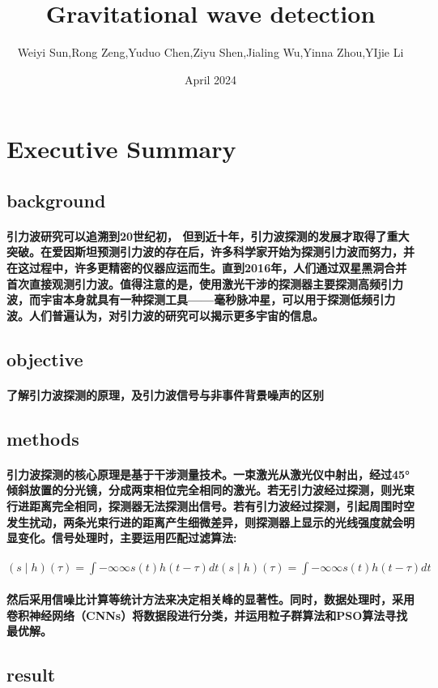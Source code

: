 \documentclass{article}
\title{Gravitational wave detection}
\author{Weiyi Sun,Rong Zeng,Yuduo Chen,Ziyu Shen,Jialing Wu,Yinna Zhou,YIjie Li}
\date{April 2024}
\begin{document}
\section{Executive Summary}
\subsection{background}
\paragraph{引力波研究可以追溯到20世纪初， 但到近十年，引力波探测的发展才取得了重大突破。在爱因斯坦预测引力波的存在后，许多科学家开始为探测引力波而努力，并在这过程中，许多更精密的仪器应运而生。直到2016年，人们通过双星黑洞合并首次直接观测引力波。值得注意的是，使用激光干涉的探测器主要探测高频引力波，而宇宙本身就具有一种探测工具——毫秒脉冲星，可以用于探测低频引力波。人们普遍认为，对引力波的研究可以揭示更多宇宙的信息。}
\subsection{objective}
\paragraph{了解引力波探测的原理，及引力波信号与非事件背景噪声的区别}
\subsection{methods}
\paragraph{引力波探测的核心原理是基于干涉测量技术。一束激光从激光仪中射出，经过45°倾斜放置的分光镜，分成两束相位完全相同的激光。若无引力波经过探测，则光束行进距离完全相同，探测器无法探测出信号。若有引力波经过探测，引起周围时空发生扰动，两条光束行进的距离产生细微差异，则探测器上显示的光线强度就会明显变化。信号处理时，主要运用匹配过滤算法:}
\paragraph{$(s∣ℎ)(τ)=∫−∞∞s(t)ℎ(t−τ)dt(s∣h)(τ)=∫−∞∞ s(t)h(t−τ)dt$}
\paragraph{ 然后采用信噪比计算等统计方法来决定相关峰的显著性。同时，数据处理时，采用卷积神经网络（CNNs）将数据段进行分类，并运用粒子群算法和PSO算法寻找最优解。} 
\subsection{result}
\end{document}
